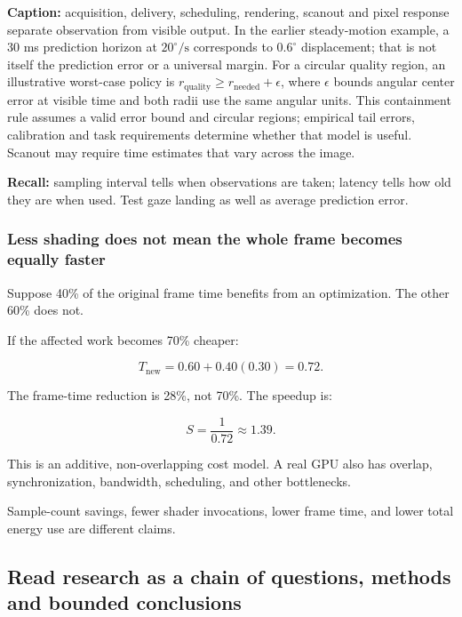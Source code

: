 
\textbf{Caption:} acquisition, delivery, scheduling, rendering, scanout and pixel response separate observation from visible output. In the earlier steady-motion example, a 30 ms prediction horizon at \(20^\circ/\mathrm{s}\) corresponds to \(0.6^\circ\) displacement; that is not itself the prediction error or a universal margin. For a circular quality region, an illustrative worst-case policy is \(r_{\mathrm{quality}}\geq r_{\mathrm{needed}}+\epsilon\), where \(\epsilon\) bounds angular center error at visible time and both radii use the same angular units. This containment rule assumes a valid error bound and circular regions; empirical tail errors, calibration and task requirements determine whether that model is useful. Scanout may require time estimates that vary across the image.

\textbf{Recall:} sampling interval tells when observations are taken; latency tells how old they are when used. Test gaze landing as well as average prediction error.

\subsubsection{Less shading does not mean the whole frame becomes equally faster}\label{04-visual-computing-ii-ch042-less-shading-does-not-mean-the-whole-frame-becomes-equally-faster}

\hypertarget{04-visual-computing-ii-ch042-less-shading-does-not-mean-the-whole-frame-becomes-equally-faster}{}

Suppose 40\% of the original frame time benefits from an optimization. The other 60\% does not.

If the affected work becomes 70\% cheaper:

\[
T_{\mathrm{new}}=0.60+0.40(0.30)=0.72.
\]

The frame-time reduction is 28\%, not 70\%. The speedup is:

\[
S=\frac1{0.72}\approx1.39.
\]

This is an additive, non-overlapping cost model. A real GPU also has overlap, synchronization, bandwidth, scheduling, and other bottlenecks.

Sample-count savings, fewer shader invocations, lower frame time, and lower total energy use are different claims.

\subsection{Read research as a chain of questions, methods and bounded conclusions}\label{04-visual-computing-ii-ch042-read-research-as-a-chain-of-questions-methods-and-bounded-conclusions}

